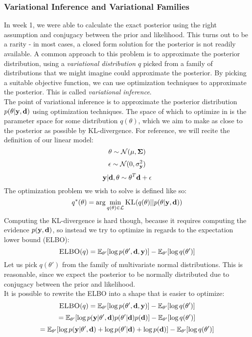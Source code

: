 \subsubsection{Variational Inference and Variational Families}
In week 1, we were able to calculate the exact posterior using the right assumption and conjugacy between the prior and likelihood.
This turns out to be a rarity - in most cases, a closed form solution for the posterior is not readily available.
A common approach to this problem is to approximate the posterior distribution, using a \textit{variational distribution} $q$ picked from a family of distributions 
that we might imagine could approximate the posterior.
By picking a suitable objective function, we can use optimization techniques to approximate the posterior.
This is called \textit{variational inference}.
\\
The point of variational inference is to approximate the posterior distribution $p(\theta | \mathbf{y}, \mathbf{d})$ using optimization techniques.
The space of which to optimize in is the parameter space for some distribution $q(\theta)$, which we aim to make as close to the posterior as possible by KL-divergence.
For reference, we will recite the definition of our linear model:
$$\theta \sim \mathcal{N}(\mathbf{\mu}, \mathbf{\Sigma})$$
$$\epsilon \sim \mathcal{N}(0, \sigma^2_{\mathbf{y}})$$
$$\mathbf{y} | \mathbf{d}, \theta \sim \theta^T \mathbf{d} + \epsilon$$
The optimization problem we wish to solve is defined like so:
$$q^*(\theta) = \arg \min_{q(\theta) \in \mathcal{L}} \textsc{KL}(q(\theta) || p(\theta | \mathbf{y}, \mathbf{d}))$$
Computing the KL-divergence is hard though, because it requires computing the evidence $p(\mathbf{y}, \mathbf{d})$, so instead we try to optimize in regards to the expectation lower bound (ELBO):
$$\textsc{ELBO}(q) = \mathbb{E}_{\theta'}[\log p(\theta', \mathbf{d}, \mathbf{y})] - \mathbb{E}_{\theta'}[\log q(\theta')]$$
Let us pick $q(\theta')$ from the family of multivariate normal distributions. This is reasonable, since we expect the posterior to be normally distributed due to conjugacy between the prior and likelihood.\\
It is possible to rewrite the ELBO into a shape that is easier to optimize:
$$\textsc{ELBO}(q) = \mathbb{E}_{\theta'}[\log p(\theta', \mathbf{d}, \mathbf{y})] - \mathbb{E}_{\theta'}[\log q(\theta')]$$
$$ = \mathbb{E}_{\theta'}[\log p(\mathbf{y} | \theta', \mathbf{d}) p(\theta' | \mathbf{d})p(\mathbf{d})] - \mathbb{E}_{\theta'}[\log q(\theta')]$$
$$ = \mathbb{E}_{\theta'}[\log p(\mathbf{y} | \theta', \mathbf{d}) + \log p(\theta' | \mathbf{d}) + \log p(\mathbf{d})] - \mathbb{E}_{\theta'}[\log q(\theta')]$$
